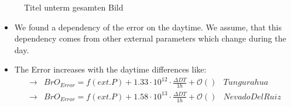 \documentclass  [
  paper    = a4,
  BCOR     = 10mm,
  twoside,
  fontsize = 12pt,
  fleqn,
  toc      = bibnumbered,
  toc      = listofnumbered,
  numbers  = noendperiod,
  headings = normal,
  listof   = leveldown,
  version  = 3.03
]                                       {scrreprt}
\begin{document}
	\begin{figure}[h!]			
		
		\caption{Titel unterm gesamten Bild}
		\label{fig:diffdaytime}
	\end{figure}
	\begin{itemize}
		\item We found a dependency of the  error on the daytime. We assume, that this dependency comes from other external parameters which change during the day. 
		\item The  Error increases with the daytime differences like: \\
		\begin{align*}
		\rightarrow&  BrO_{Error} = f(ext. P)+1.33\cdot10^{12}\cdot\frac{\Delta DT}{1h}  + \mathcal{O}\left(\right)& Tungurahua\\
		\rightarrow&  BrO_{Error} = f(ext. P)+1.58\cdot10^{13}\cdot\frac{\Delta DT}{1h} + \mathcal{O}\left(\right) & Nevado Del Ruiz\\
		\end{align*}
		
	\end{itemize}
\end{document}
